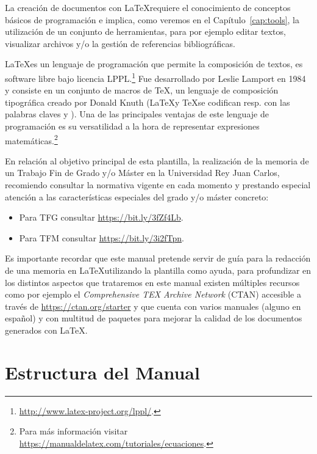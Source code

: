 \documentclass[twoside]{urjc-tfg}
\begin{document}
\cleardoublepage
{}
\setcounter{page}{1}

La creación de documentos con \LaTeX requiere el conocimiento de
conceptos básicos de programación e implica, como veremos en el
Capítulo~\ref{cap:tools}, la utilización de un conjunto de
herramientas, para por ejemplo editar textos, visualizar archivos
 y/o la gestión de referencias bibliográficas.

\LaTeX es un lenguaje de programación que permite la composición de
textos, es software libre bajo licencia
LPPL.\footnote{\url{http://www.latex-project.org/lppl/}.} Fue
desarrollado por Leslie Lamport en 1984 y consiste en un conjunto de
macros de \TeX, un lenguaje de composición tipográfica creado por
Donald Knuth (\LaTeX y \TeX se codifican resp. con las palabras claves
\code{\LaTeX} y \code{\TeX}). Una de las principales ventajas de este
lenguaje de programación es su versatilidad a la hora de representar
expresiones matemáticas.\footnote{Para más información visitar
  \url{https://manualdelatex.com/tutoriales/ecuaciones}.}

En relación al objetivo principal de esta plantilla, la realización de
la memoria de un Trabajo Fin de Grado y/o Máster en la Universidad Rey
Juan Carlos, recomiendo consultar la normativa vigente en cada momento
y prestando especial atención a las características especiales del
grado y/o máster concreto:

\begin{itemize}
\item Para TFG consultar
  \url{https://bit.ly/3fZf4Lb}.
\item Para TFM consultar
  \url{https://bit.ly/3i2fTpn}.
\end{itemize}

Es importante recordar que este manual pretende servir de guía para la
redacción de una memoria en \LaTeX utilizando la plantilla como ayuda,
para profundizar en los distintos aspectos que trataremos en este
manual existen múltiples recursos como por ejemplo el
\emph{Comprehensive TEX Archive Network} (CTAN) accesible a través de
\url{https://ctan.org/starter} y que cuenta con varios manuales
(alguno en español) y con multitud de paquetes para mejorar la calidad
de los documentos generados con \LaTeX.

\section{Estructura del Manual}
\label{sec:man}
\end{document}
